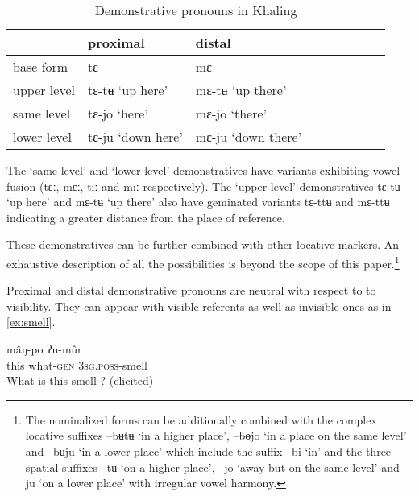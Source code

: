 \documentclass[oldfontcommands,oneside,a4paper,11pt]{article}
\newcommand{\ipa}[1]{{\phon \mbox{#1}}} %
\begin{document}
 
\begin{table}[h]
\caption{Demonstrative pronouns in Khaling} \centering \label{tab:pro}
\begin{tabular}{lllllllll}
\toprule
	& proximal & distal \\
 
\midrule
	base form    &	\ipa{tɛ}        &	\ipa{mɛ}        &	\\
	upper level    &	\ipa{tɛ-tʉ}   `up here'    &	\ipa{mɛ-tʉ}   `up there'    &	\\
	same level    &	\ipa{tɛ-jo}   `here' &     \ipa{mɛ-jo}        `there' &	\\
	lower level   &	\ipa{tɛ-ju}  `down here'  &    	\ipa{mɛ-ju}     	 `down there' &	\\
\bottomrule
\end{tabular} 
\end{table}

The `same level' and  `lower level' demonstratives have variants exhibiting vowel fusion (\ipa{tɛː}, \ipa{mɛ̄ː}, \ipa{tīː} and \ipa{mīː}  respectively). The `upper level' demonstratives \ipa{tɛ-tʉ}   `up here' and	\ipa{mɛ-tʉ}   `up there' also have geminated variants \ipa{tɛ-ttʉ}  and	\ipa{mɛ-ttʉ} indicating a greater distance from the place of reference.


These demonstratives can be further combined with other locative markers. An exhaustive description of all the possibilities is beyond the scope of this paper.\footnote{The nominalized forms can be additionally combined with the complex locative suffixes \ipa{--bʉtʉ} `in a higher place', \ipa{--bɵjo} `in a place on the same level' and \ipa{--bʉju} `in a lower place' which include the suffix \ipa{--bi} `in' and the three spatial suffixes \ipa{--tʉ} `on a higher place', \ipa{--jo} `away but on the same level' and \ipa{--ju} `on a lower place' with irregular vowel harmony.}



Proximal and distal demonstrative pronouns are neutral with respect to to visibility. They can appear with visible referents as well as invisible ones as in \ref{ex:smell}.
 

\begin{exe}
\ex \label{ex:smell}
\gll   \ipa{tɛ}    \ipa{mâŋ-po}    \ipa{ʔu-mûr}   \\
this what-\textsc{gen} \textsc{3sg.poss}-smell\\
\glt What is this smell ? (elicited)
\end{exe}
\end{document}
